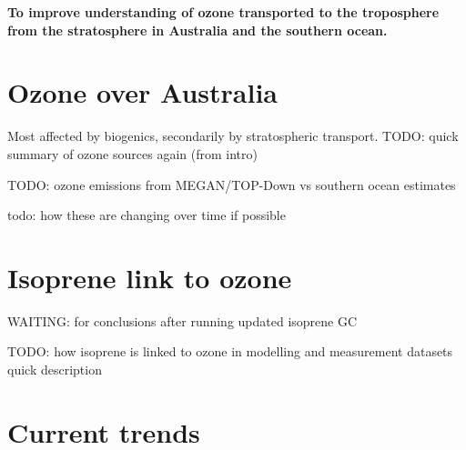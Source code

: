   \textbf{To improve understanding of ozone transported to the troposphere from the stratosphere in Australia and the southern ocean.}

\section{Ozone over Australia}
\label{Conclusions:ozone}
  
  Most affected by biogenics, secondarily by stratospheric transport.
 	TODO: quick summary of ozone sources again (from intro)
   
  TODO: ozone emissions from MEGAN/TOP-Down vs southern ocean estimates

  todo: how these are changing over time if possible

\section{Isoprene link to ozone}
\label{Conclusions:isoprene}
  
  WAITING: for conclusions after running updated isoprene GC
  
  TODO: how isoprene is linked to ozone in modelling and measurement datasets quick description
  
\section{Current trends}
\label{Conclusions:trends}

